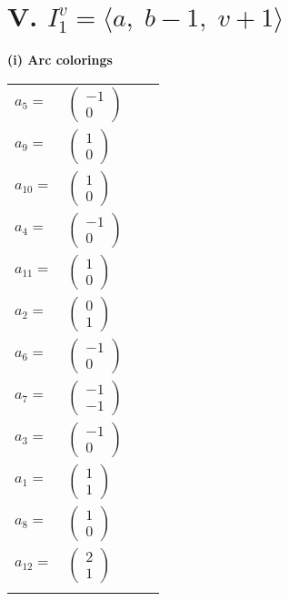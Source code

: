 \documentclass[1p]{elsarticle_modified}
\theoremstyle{definition}
\begin{document}
\centering \section*{V. $I^v_{1}= \langle a,\;b-1,\;v+1 \rangle$}
\flushleft \textbf{(i) Arc colorings}\\
\begin{tabular}{m{7pt} m{180pt} m{7pt} m{180pt} }
\flushright $a_{5}=$&$\begin{pmatrix}-1\\0\end{pmatrix}$ \\
\flushright $a_{9}=$&$\begin{pmatrix}1\\0\end{pmatrix}$ \\
\flushright $a_{10}=$&$\begin{pmatrix}1\\0\end{pmatrix}$ \\
\flushright $a_{4}=$&$\begin{pmatrix}-1\\0\end{pmatrix}$ \\
\flushright $a_{11}=$&$\begin{pmatrix}1\\0\end{pmatrix}$ \\
\flushright $a_{2}=$&$\begin{pmatrix}0\\1\end{pmatrix}$ \\
\flushright $a_{6}=$&$\begin{pmatrix}-1\\0\end{pmatrix}$ \\
\flushright $a_{7}=$&$\begin{pmatrix}-1\\-1\end{pmatrix}$ \\
\flushright $a_{3}=$&$\begin{pmatrix}-1\\0\end{pmatrix}$ \\
\flushright $a_{1}=$&$\begin{pmatrix}1\\1\end{pmatrix}$ \\
\flushright $a_{8}=$&$\begin{pmatrix}1\\0\end{pmatrix}$ \\
\flushright $a_{12}=$&$\begin{pmatrix}2\\1\end{pmatrix}$\\&\end{tabular}
\end{document}
